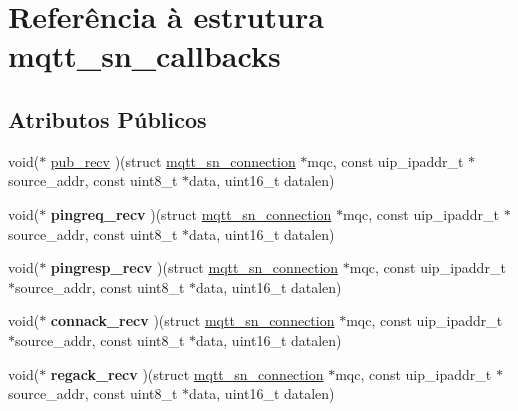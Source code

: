 \hypertarget{structmqtt__sn__callbacks}{\section{Referência à estrutura mqtt\+\_\+sn\+\_\+callbacks}
\label{structmqtt__sn__callbacks}
}
\subsection*{Atributos Públicos}
\begin{DoxyCompactItemize}
\item 
void($\ast$ \hyperlink{structmqtt__sn__callbacks_abb5a49835c717825b5578762401e13c6}{pub\+\_\+recv} )(struct \hyperlink{structmqtt__sn__connection}{mqtt\+\_\+sn\+\_\+connection} $\ast$mqc, const uip\+\_\+ipaddr\+\_\+t $\ast$source\+\_\+addr, const uint8\+\_\+t $\ast$data, uint16\+\_\+t datalen)
\item 
\hypertarget{structmqtt__sn__callbacks_a1b7defdc8e21bcd18888d4eb2090a06b}{void($\ast$ {\bfseries pingreq\+\_\+recv} )(struct \hyperlink{structmqtt__sn__connection}{mqtt\+\_\+sn\+\_\+connection} $\ast$mqc, const uip\+\_\+ipaddr\+\_\+t $\ast$source\+\_\+addr, const uint8\+\_\+t $\ast$data, uint16\+\_\+t datalen)}\label{structmqtt__sn__callbacks_a1b7defdc8e21bcd18888d4eb2090a06b}

\item 
\hypertarget{structmqtt__sn__callbacks_ae7d8d1060e63df4c063e1020fa89dd16}{void($\ast$ {\bfseries pingresp\+\_\+recv} )(struct \hyperlink{structmqtt__sn__connection}{mqtt\+\_\+sn\+\_\+connection} $\ast$mqc, const uip\+\_\+ipaddr\+\_\+t $\ast$source\+\_\+addr, const uint8\+\_\+t $\ast$data, uint16\+\_\+t datalen)}\label{structmqtt__sn__callbacks_ae7d8d1060e63df4c063e1020fa89dd16}

\item 
\hypertarget{structmqtt__sn__callbacks_afdbb19f71585ba5b4cea7f494b0683e7}{void($\ast$ {\bfseries connack\+\_\+recv} )(struct \hyperlink{structmqtt__sn__connection}{mqtt\+\_\+sn\+\_\+connection} $\ast$mqc, const uip\+\_\+ipaddr\+\_\+t $\ast$source\+\_\+addr, const uint8\+\_\+t $\ast$data, uint16\+\_\+t datalen)}\label{structmqtt__sn__callbacks_afdbb19f71585ba5b4cea7f494b0683e7}

\item 
\hypertarget{structmqtt__sn__callbacks_aa64bd28c8cf75cb9f0ff38ab13598e26}{void($\ast$ {\bfseries regack\+\_\+recv} )(struct \hyperlink{structmqtt__sn__connection}{mqtt\+\_\+sn\+\_\+connection} $\ast$mqc, const uip\+\_\+ipaddr\+\_\+t $\ast$source\+\_\+addr, const uint8\+\_\+t $\ast$data, uint16\+\_\+t datalen)}\label{structmqtt__sn__callbacks_aa64bd28c8cf75cb9f0ff38ab13598e26}


\end{DoxyCompactItemize}
